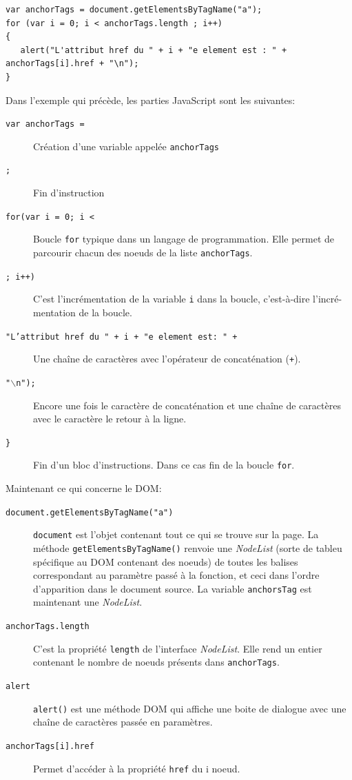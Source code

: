 \documentclass[10pt,a4paper,titlepage]{article}
\begin{document}
\begin{lstlisting}
var anchorTags = document.getElementsByTagName("a");
for (var i = 0; i < anchorTags.length ; i++)
{
   alert("L'attribut href du " + i + "e element est : " + anchorTags[i].href + "\n");
}	
\end{lstlisting}

Dans l'exemple qui précède, les parties JavaScript sont les suivantes:
\begin{description}
	\item [\texttt{var anchorTags =}] {Création d'une variable appelée \texttt{anchorTags}}
	\item [\texttt{;}] {Fin d'instruction}
	\item [\texttt{for(var i = 0; i < }] {Boucle \texttt{for} typique dans un langage de programmation. Elle permet de parcourir chacun des noeuds de la liste \texttt{anchorTags}.}
	\item [\texttt{; i++)}] {C'est l'incrémentation de la variable \texttt{i} dans la boucle, c'est-à-dire l'incré-mentation de la boucle.}
	\item [\texttt{"L'attribut href du " + i + "e element est: " +}] {Une chaîne de caractères avec l'opérateur de concaténation (\texttt{+}).}
	\item [\texttt{"$\backslash$n");}] {Encore une fois le caractère de concaténation et une chaîne de caractères avec le caractère le retour à la ligne.}
	\item [\texttt{\}}] {Fin d'un bloc d'instructions. Dans ce cas fin de la boucle \texttt{for}.}
\end{description}

Maintenant ce qui concerne le DOM:
\begin{description}
	\item [\texttt{document.getElementsByTagName("a")}] {\texttt{document} est l'objet contenant tout ce qui se trouve sur la page. La méthode \texttt{getElementsByTagName()} renvoie une \emph{NodeList} (sorte de tableu spécifique au DOM contenant des noeuds) de toutes les balises correspondant au paramètre passé à la fonction, et ceci dans l'ordre d'apparition dans le document source. La variable \texttt{anchorsTag} est maintenant une \emph{NodeList}.}
	\item [\texttt{anchorTags.length}] {C'est la propriété \texttt{length} de l'interface \emph{NodeList}. Elle rend un entier contenant le nombre de noeuds présents dans \texttt{anchorTags}.}
	\item [\texttt{alert}] {\texttt{alert()} est une méthode DOM qui affiche une boite de dialogue avec une chaîne de caractères passée en paramètres.}
	\item [\texttt{anchorTags[i].href}] {Permet d'accéder à la propriété \texttt{href} du i noeud.}
\end{description}
\end{document}
